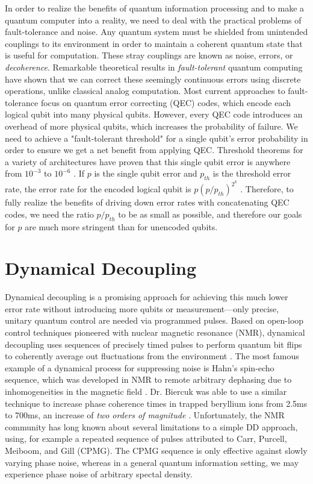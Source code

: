 \documentclass{article}
\begin{document}
In order to realize the benefits of quantum information processing and
to make a quantum computer into a reality, we need to deal with the
practical problems of fault-tolerance and noise.
Any quantum system must be shielded from
unintended couplings to its environment in order to maintain a coherent 
quantum state that is useful for computation. These stray couplings are
known as noise, errors, or {\em decoherence}. Remarkable theoretical results in
{\em fault-tolerant} quantum computing have shown that we can correct these
seemingly continuous errors using discrete operations, unlike classical
analog computation. Most current approaches to fault-tolerance focus on
quantum error correcting (QEC) codes, which encode
each logical qubit into many physical qubits. However, every QEC code introduces
an overhead of more physical qubits, which increases the probability of
failure. We need to achieve a "fault-tolerant threshold" for a single qubit's
error probability in order to ensure we get a net benefit from applying QEC.
Threshold theorems for a variety of architectures have proven that this single
qubit error is anywhere from $10^{-3}$ to $10^{-6}$ \cite{NC2000}.
If $p$ is the single qubit error and $p_{th}$ is the threshold error rate,
the error rate for the encoded logical qubit is $p(p/p_{th})^{2^k}$ \cite{NC2000}.
Therefore, to fully realize the benefits of driving down error rates with
concatenating QEC codes, we need the ratio $p/p_{th}$ to be as small as possible,
and therefore our goals for $p$ are much more stringent than for unencoded
qubits.

\section{Dynamical Decoupling}

Dynamical decoupling is a promising approach for achieving this much lower error
rate without introducing more qubits or measurement---only precise, unitary quantum
control are needed via programmed pulses.
Based on open-loop control techniques pioneered with
nuclear magnetic resonance (NMR), dynamical decoupling uses sequences of
precisely timed pulses to perform quantum bit flips to coherently average out
fluctuations from the environment \cite{VL1998}.
The most famous example of a dynamical
process for suppressing noise is Hahn's spin-echo sequence, which was
developed in NMR to remote arbitrary dephasing due to inhomogeneities in the
magnetic field \cite{}. Dr. Biercuk was able to use a similar technique
to increase phase coherence times in trapped beryllium ions from 2.5ms to 700ms, an
increase of {\em two orders of magnitude} \cite{BUVSIB2009a}.
Unfortunately, the NMR community has long known about several limitations
to a simple DD approach, using, for example a repeated sequence of
pulses attributed to Carr, Purcell, Meiboom, and Gill (CPMG). The CPMG
sequence is only effective against slowly varying phase noise, whereas
in a general quantum information setting, we may experience phase noise
of arbitrary spectal density.
\end{document}
